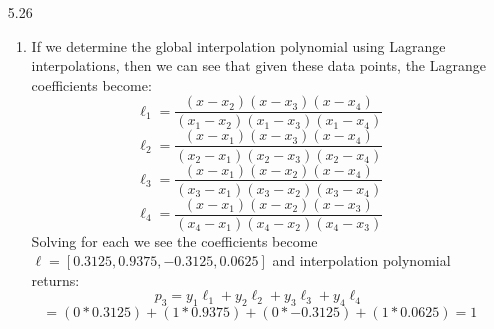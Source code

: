 \documentclass[11pt,a4paper]{article}
\begin{document}
\begin{itemize}
\begin{enumerate} [label={\alph*)}]
					Once these values are found, the Thomas algorithm solves for the remaining $a_i$'s in 8n-7 FLOPS. Putting it all together, we have (4)+(n+1)+(8n-7) = $9n-2$ FLOPS and fortunately we only have to calculate the $a_i$'s once. Returning to our equation for $s(x)$ we have that we calculate the value of the $a_i$'s once for $9n-2$ FLOPS, we then have 8 FLOPS to calculate $B_i$ and 1 multiplication for $a_iB_i(x)$. This is done $n+3$ times and then the values are summed for a total of $n+2$ additions:
					$$(9n-2)+(n+3)(9)+(n+2) = 19n+27$$
					
					From greatest to least we have Lagrange, cubic, piece-wise linear.
					
					\item From the last part we see that we only have to calculate the $a_i$'s once for the cubic spline, but we will have to calculate the Lagrange coefficients again for the new value of x (meaning the total FLOP count will not change), and we will need to again calculate the values of $G_i(x)$ for the piece-wise interpolation. Since Lagrange doesn't come down, and the cubic doesn't reduce significantly enough to beat the $5n+4$ FLOPS of the piece-wise, the ordering doesn't change, despite having pre-computed the $a_i$'s (making the cubic take at least $9n-2$ less FLOPS).
				\end{enumerate}
				
			\item[5.26]
				\begin{enumerate} [label={\alph*)}]
					\item If we determine the global interpolation polynomial using Lagrange interpolations, then we can see that given these data points, the Lagrange coefficients become:
					$$\ell_1 = \frac{(x-x_2)(x-x_3)(x-x_4)}{(x_1-x_2)(x_1-x_3)(x_1-x_4)}$$
					$$\ell_2 = \frac{(x-x_1)(x-x_3)(x-x_4)}{(x_2-x_1)(x_2-x_3)(x_2-x_4)}$$
					$$\ell_3 = \frac{(x-x_1)(x-x_2)(x-x_4)}{(x_3-x_1)(x_3-x_2)(x_3-x_4)}$$
					$$\ell_4 = \frac{(x-x_1)(x-x_2)(x-x_3)}{(x_4-x_1)(x_4-x_2)(x_4-x_3)}$$
					Solving for each we see the coefficients become $\ell = [0.3125,0.9375,-0.3125,0.0625]$ and interpolation polynomial returns:
					$$p_3=y_1\ell_1 + y_2\ell_2 + y_3\ell_3 + y_4\ell_4$$ $$= (0*0.3125) + (1*0.9375) + (0*-0.3125) + (1*0.0625) = 1$$
    

\end{enumerate}
\end{itemize}
\end{document}
